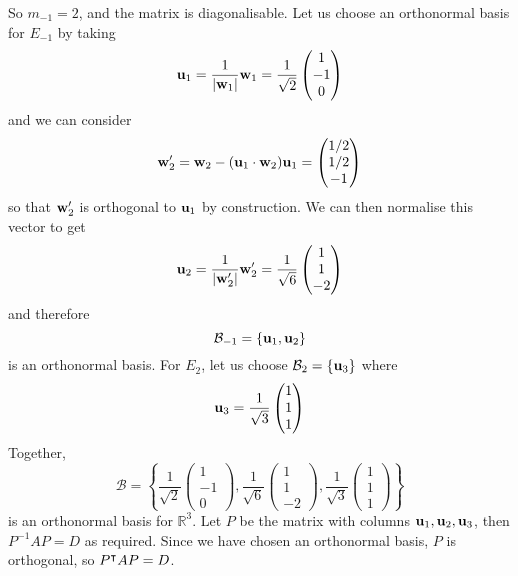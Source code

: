 \begin{enumerate}
	      So \(m_{-1} = 2\), and the matrix is diagonalisable.
	      Let us choose an orthonormal basis for \(E_{-1}\) by taking
	      \[
		      \vb u_1 = \frac{1}{\abs{\vb w_1}}\vb w_1 = \frac{1}{\sqrt 2}\begin{pmatrix}
			      1 \\ -1 \\ 0
		      \end{pmatrix}
	      \]
	      and we can consider
	      \[
		      \vb w_2' = \vb w_2 - (\vb u_1 \cdot \vb w_2)\vb u_1 = \begin{pmatrix}
			      1/2 \\ 1/2 \\ -1
		      \end{pmatrix}
	      \]
	      so that \(\vb w_2'\) is orthogonal to \(\vb u_1\) by construction.
	      We can then normalise this vector to get
	      \[
		      \vb u_2 = \frac{1}{\abs{\vb w_2'}}\vb w_2' = \frac{1}{\sqrt 6} \begin{pmatrix}
			      1 \\ 1 \\ -2
		      \end{pmatrix}
	      \]
	      and therefore
	      \[
		      \mathcal B_{-1} = \{ \vb u_1, \vb u_2 \}
	      \]
	      is an orthonormal basis.
	      For \(E_2\), let us choose \(\mathcal B_2 = \{ \vb u_3 \}\) where
	      \[
		      \vb u_3 = \frac{1}{\sqrt 3}\begin{pmatrix}
			      1 \\ 1 \\ 1
		      \end{pmatrix}
	      \]
	      Together,
	      \[
		      \mathcal B = \left\{ \frac{1}{\sqrt 2}\begin{pmatrix}
			      1 \\ -1 \\ 0
		      \end{pmatrix}, \frac{1}{\sqrt 6} \begin{pmatrix}
			      1 \\ 1 \\ -2
		      \end{pmatrix}, \frac{1}{\sqrt 3}\begin{pmatrix}
			      1 \\ 1 \\ 1
		      \end{pmatrix} \right\}
	      \]
	      is an orthonormal basis for \(\mathbb R^3\).
	      Let \(P\) be the matrix with columns \(\vb u_1, \vb u_2, \vb u_3\), then \(P^{-1}AP = D\) as required.
	      Since we have chosen an orthonormal basis, \(P\) is orthogonal, so \(P^\intercal AP = D\).
\end{enumerate}

